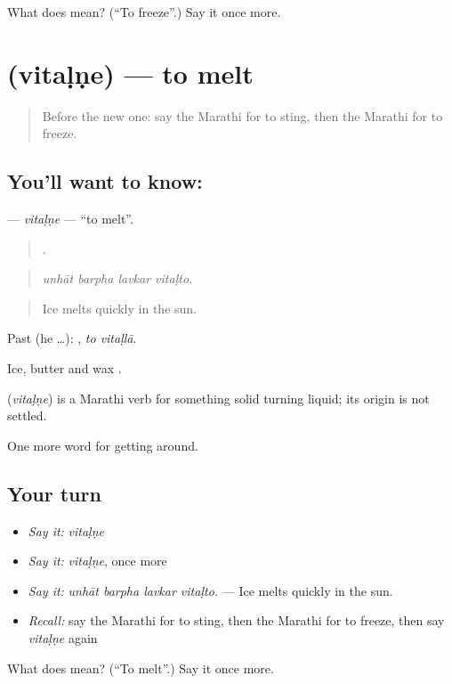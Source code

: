 \begin{tcolorbox}[breakable,colback=teal!4,colframe=teal!35!black,title={Before you move on}]
What does  mean? (\textquotedblleft{}To freeze\textquotedblright{}.) Say it once more.
\end{tcolorbox}
\section[\texorpdfstring{\mr{वितळणे} (vitaḷṇe)}{वितळणे (vitaḷṇe)}]{ (vitaḷṇe) — to melt}

\label{lesson:MR-C437-vitalne}



\begin{quote}
Before the new one: say the Marathi for to sting, then the Marathi for to freeze.
\end{quote}

\subsection*{You'll want to know: }
\textbf{} — \emph{vitaḷṇe} — \textquotedblleft{}to melt\textquotedblright{}.

\begin{quote}
   .
\end{quote}

\begin{quote}
\emph{unhāt barpha lavkar vitaḷto.}
\end{quote}

\begin{quote}
Ice melts quickly in the sun.
\end{quote}

Past (he …):  , \emph{to vitaḷlā}.

Ice, butter and wax .

\begin{cousinweb}
\textbf{} (\emph{vitaḷṇe}) is a Marathi verb for something solid turning liquid; its origin is not settled.
\end{cousinweb}

\begin{grammarlens}[title={What you've built}]
One more word for getting around.
\end{grammarlens}

\subsection*{Your turn}
\begin{itemize}
\raggedright
  \item \emph{Say it:} \emph{vitaḷṇe}
  \item \emph{Say it:} \emph{vitaḷṇe}, once more
  \item \emph{Say it:} \emph{unhāt barpha lavkar vitaḷto.} — Ice melts quickly in the sun.
  \item \emph{Recall:} say the Marathi for to sting, then the Marathi for to freeze, then say \emph{vitaḷṇe} again
\end{itemize}

\begin{tcolorbox}[breakable,colback=teal!4,colframe=teal!35!black,title={Before you move on}]
What does  mean? (\textquotedblleft{}To melt\textquotedblright{}.) Say it once more.
\end{tcolorbox}

